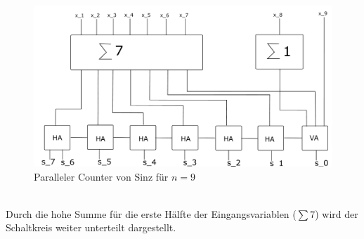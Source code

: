 \documentclass[a4,abstract=on]{scrartcl}
\begin{document}
\begin{figure}[H]
\centering
\includegraphics[width=\textwidth]{bsp_Sinz_grob.pdf}
\caption{Paralleler Counter von Sinz für $n=9$}
\label{fig:sinz_counter_para_bsp}
\end{figure}
\ \\
Durch die hohe Summe für die erste Hälfte der Eingangsvariablen ($\sum 7$) wird der Schaltkreis weiter unterteilt dargestellt.
\end{document}
